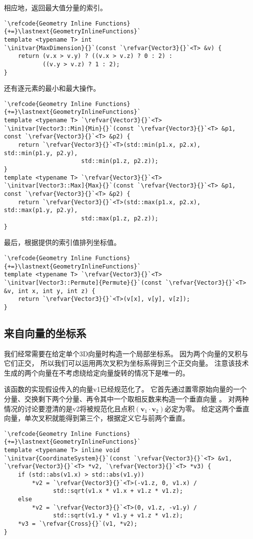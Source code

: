 相应地，返回最大值分量的索引。
\begin{lstlisting}
`\refcode{Geometry Inline Functions}{+=}\lastnext{GeometryInlineFunctions}`
template <typename T> int
`\initvar{MaxDimension}{}`(const `\refvar{Vector3}{}`<T> &v) {
    return (v.x > v.y) ? ((v.x > v.z) ? 0 : 2) : 
           ((v.y > v.z) ? 1 : 2);
}
\end{lstlisting}

还有逐元素的最小和最大操作。
\begin{lstlisting}
`\refcode{Geometry Inline Functions}{+=}\lastnext{GeometryInlineFunctions}`
template <typename T> `\refvar{Vector3}{}`<T>
`\initvar[Vector3::Min]{Min}{}`(const `\refvar{Vector3}{}`<T> &p1, const `\refvar{Vector3}{}`<T> &p2) {
    return `\refvar{Vector3}{}`<T>(std::min(p1.x, p2.x), std::min(p1.y, p2.y), 
                      std::min(p1.z, p2.z));
}
template <typename T> `\refvar{Vector3}{}`<T>
`\initvar[Vector3::Max]{Max}{}`(const `\refvar{Vector3}{}`<T> &p1, const `\refvar{Vector3}{}`<T> &p2) {
    return `\refvar{Vector3}{}`<T>(std::max(p1.x, p2.x), std::max(p1.y, p2.y), 
                      std::max(p1.z, p2.z));
}
\end{lstlisting}

最后，根据提供的索引值排列坐标值。
\begin{lstlisting}
`\refcode{Geometry Inline Functions}{+=}\lastnext{GeometryInlineFunctions}`
template <typename T> `\refvar{Vector3}{}`<T>
`\initvar[Vector3::Permute]{Permute}{}`(const `\refvar{Vector3}{}`<T> &v, int x, int y, int z) {
    return `\refvar{Vector3}{}`<T>(v[x], v[y], v[z]);
}
\end{lstlisting}

\subsection{来自向量的坐标系}\label{sub:来自向量的坐标系}
我们经常需要在给定单个3D向量时构造一个局部坐标系。
因为两个向量的叉积与它们正交，
所以我们可以运用两次叉积为坐标系得到三个正交向量。
注意该技术生成的两个向量在不考虑绕给定向量旋转的情况下是唯一的。

该函数的实现假设传入的向量{\ttfamily v1}已经规范化了。
它首先通过置零原始向量的一个分量、交换剩下两个分量、再令其中一个取相反数来构造一个垂直向量
。
对两种情况的讨论要澄清的是{\ttfamily v2}将被规范化且点积$(\bm v_1\cdot\bm v_2)$必定为零。
给定这两个垂直向量，单次叉积就能得到第三个，根据定义它与前两个垂直。
\begin{lstlisting}
`\refcode{Geometry Inline Functions}{+=}\lastnext{GeometryInlineFunctions}`
template <typename T> inline void
`\initvar{CoordinateSystem}{}`(const `\refvar{Vector3}{}`<T> &v1, `\refvar{Vector3}{}`<T> *v2, `\refvar{Vector3}{}`<T> *v3) {
    if (std::abs(v1.x) > std::abs(v1.y))
        *v2 = `\refvar{Vector3}{}`<T>(-v1.z, 0, v1.x) /
              std::sqrt(v1.x * v1.x + v1.z * v1.z);
    else
        *v2 = `\refvar{Vector3}{}`<T>(0, v1.z, -v1.y) /
              std::sqrt(v1.y * v1.y + v1.z * v1.z);
    *v3 = `\refvar{Cross}{}`(v1, *v2);
}
\end{lstlisting}